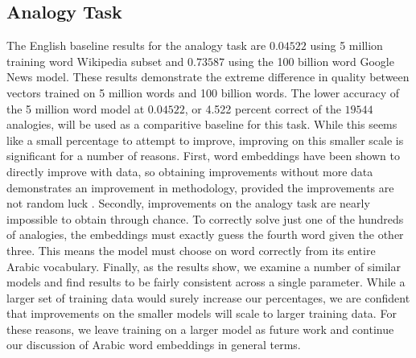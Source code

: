 





\subsection{Analogy Task}

The English baseline results for the analogy task are $0.04522$ using 5 million training word Wikipedia subset and $0.73587$ using the 100 billion word Google News model. These results demonstrate the extreme difference in quality between vectors trained on 5 million words and 100 billion words. The lower accuracy of the 5 million word model at $0.04522$, or 4.522 percent correct of the $19544$ analogies, will be used as a comparitive baseline for this task. While this seems like a small percentage to attempt to improve, improving on this smaller scale is significant for a number of reasons. First, word embeddings have been shown to directly improve with data, so obtaining improvements without more data demonstrates an improvement in methodology, provided the improvements are not random luck \cite{mikolovdist:2013}. Secondly, improvements on the analogy task are nearly impossible to obtain through chance. To correctly solve just one of the hundreds of analogies, the embeddings must exactly guess the fourth word given the other three. This means the model must choose on word correctly from its entire Arabic vocabulary. Finally, as the results show, we examine a number of similar models and find results to be fairly consistent across a single parameter. While a larger set of training data would surely increase our percentages, we are confident that improvements on the smaller models will scale to larger training data. For these reasons, we leave training on a larger model as future work and continue our discussion of Arabic word embeddings in general terms.

